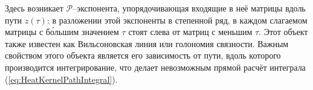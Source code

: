 Здесь возникает $\mathcal{P}$--экспонента, упорядочивающая входящие в неё матрицы вдоль пути $z(\tau)$: в разложении этой экспоненты в степенной ряд, в каждом слагаемом матрицы с б\'{о}льшим значением $\tau$ стоят слева от матриц с меньшим $\tau$. Этот объект также известен как Вильсоновская линия или голономия связности. Важным свойством этого объекта является его зависимость от пути, вдоль которого производится интегрирование, что делает невозможным прямой расчёт интеграла (\ref{eq:HeatKernelPathIntegral}).
